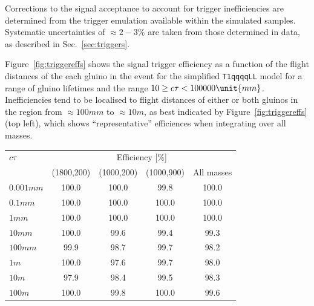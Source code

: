 Corrections to the signal acceptance to account for trigger
inefficiencies are determined from the trigger emulation available
within the simulated samples. Systematic uncertainties of
${\approx}2-3\%$ are taken from those determined in data, as described
in Sec.~\ref{sec:triggers}.

Figure~\ref{fig:triggereffs} shows the signal trigger efficiency as a
function of the flight distances of the each gluino in the event for
the simplified \texttt{T1qqqqLL} model for a range of gluino lifetimes
and the range $10 \geq \ctau < 100000\unit{mm}$. Inefficiencies tend
to be localised to flight distances of either or both gluinos in the
region from ${\approx}100\unit{mm}$ to ${\approx}10\unit{m}$, as best
indicated by Figure~\ref{fig:triggereffs} (top left), which shows
``representative'' efficiences when integrating over all masses.

\begin{table}[h!]
  \centering
  \begin{tabular}{lcccc} 
    \hline
    $c\tau$          & \multicolumn{4}{c}{Efficiency [\%]}               \\
    \cline{2-5}
                     & (1800,200) & (1000,200) & (1000,900) & All masses \\
    \hline
    $0.001\unit{mm}$ & 100.0      & 100.0      & 99.8       & 100.0      \\
    $0.1\unit{mm}$   & 100.0      & 100.0      & 100.0      & 100.0      \\
    $1\unit{mm}$     & 100.0      & 100.0      & 100.0      & 100.0      \\
    $10\unit{mm}$    & 100.0      & 99.6       & 99.4       & 99.3       \\
    $100\unit{mm}$   & 99.9       & 98.7       & 99.7       & 98.2       \\
    $1\unit{m}$      & 100.0      & 97.6       & 99.7       & 98.0       \\
    $10\unit{m}$     & 97.9       & 98.4       & 99.5       & 98.3       \\
    $100\unit{m}$    & 100.0      & 99.8       & 100.0      & 99.6       \\
    \hline
  \end{tabular}
  \label{tab:LLP-triggereff}
\end{table}

